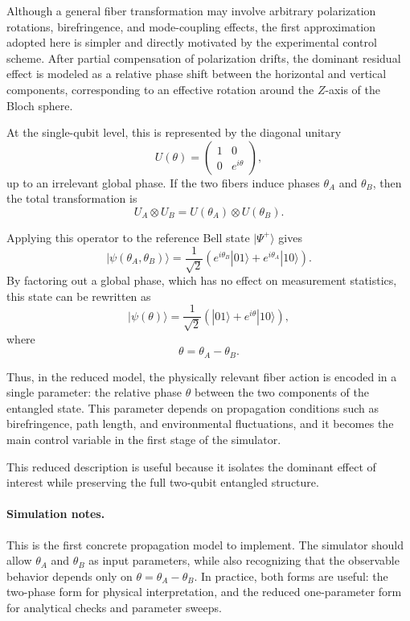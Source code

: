 \documentclass[a4paper]{article}
\begin{document}
Although a general fiber transformation may involve arbitrary polarization rotations, birefringence, and mode-coupling effects, the first approximation adopted here is simpler and directly motivated by the experimental control scheme. After partial compensation of polarization drifts, the dominant residual effect is modeled as a relative phase shift between the horizontal and vertical components, corresponding to an effective rotation around the \(Z\)-axis of the Bloch sphere.

At the single-qubit level, this is represented by the diagonal unitary
\[
U(\theta)
=
\begin{pmatrix}
1 & 0\\
0 & e^{i\theta}
\end{pmatrix},
\]
up to an irrelevant global phase. If the two fibers induce phases \(\theta_A\) and \(\theta_B\), then the total transformation is
\[
U_A \otimes U_B
=
U(\theta_A)\otimes U(\theta_B).
\]

Applying this operator to the reference Bell state \( |\Psi^+\rangle \) gives
\[
|\psi(\theta_A,\theta_B)\rangle
=
\frac{1}{\sqrt{2}}
\left(
e^{i\theta_B}|01\rangle
+
e^{i\theta_A}|10\rangle
\right).
\]
By factoring out a global phase, which has no effect on measurement statistics, this state can be rewritten as
\[
|\psi(\theta)\rangle
=
\frac{1}{\sqrt{2}}
\left(
|01\rangle
+
e^{i\theta}|10\rangle
\right),
\]
where
\[
\theta = \theta_A - \theta_B.
\]

Thus, in the reduced model, the physically relevant fiber action is encoded in a single parameter: the relative phase \(\theta\) between the two components of the entangled state. This parameter depends on propagation conditions such as birefringence, path length, and environmental fluctuations, and it becomes the main control variable in the first stage of the simulator.

This reduced description is useful because it isolates the dominant effect of interest while preserving the full two-qubit entangled structure.

\paragraph{Simulation notes.}
This is the first concrete propagation model to implement. The simulator should allow \(\theta_A\) and \(\theta_B\) as input parameters, while also recognizing that the observable behavior depends only on \(\theta=\theta_A-\theta_B\). In practice, both forms are useful: the two-phase form for physical interpretation, and the reduced one-parameter form for analytical checks and parameter sweeps.
\end{document}
